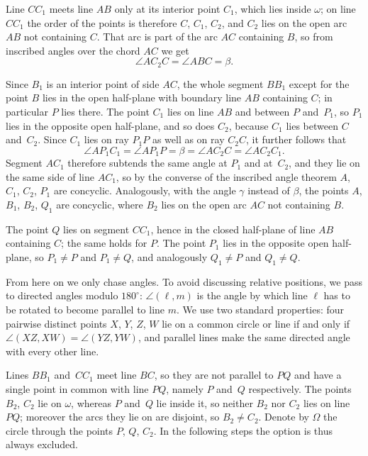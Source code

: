 {    Line $CC_1$ meets line $AB$ only at its interior point $C_1$, which lies inside $\omega$; on line $CC_1$ the order of the points is therefore $C$, $C_1$, $C_2$, and $C_2$ lies on the open arc $AB$ not containing $C$. That arc is part of the arc $AC$ containing $B$, so from inscribed angles over the chord $AC$ we get
    $$
    \angle AC_2C = \angle ABC = \beta.
    $$

    Since $B_1$ is an interior point of side $AC$, the whole segment $BB_1$ except for the point $B$ lies in the open half-plane with boundary line $AB$ containing $C$; in particular $P$ lies there. The point $C_1$ lies on line $AB$ and between $P$ and~$P_1$, so $P_1$ lies in the opposite open half-plane, and so does $C_2$, because $C_1$ lies between $C$ and~$C_2$. Since $C_1$ lies on ray $P_1P$ as well as on ray $C_2C$, it further follows that
    $$
    \angle AP_1C_1 = \angle AP_1P = \beta = \angle AC_2C = \angle AC_2C_1.
    $$
    Segment $AC_1$ therefore subtends the same angle at $P_1$ and at~$C_2$, and they lie on the same side of line $AC_1$, so by the converse of the inscribed angle theorem $A$, $C_1$, $C_2$, $P_1$ are concyclic. Analogously, with the angle $\gamma$ instead of $\beta$, the points $A$, $B_1$, $B_2$, $Q_1$ are concyclic, where $B_2$ lies on the open arc $AC$ not containing $B$.

    The point $Q$ lies on segment $CC_1$, hence in the closed half-plane of line $AB$ containing $C$; the same holds for $P$. The point $P_1$ lies in the opposite open half-plane, so $P_1 \neq P$ and $P_1 \neq Q$, and analogously $Q_1 \neq P$ and $Q_1 \neq Q$.

    From here on we only chase angles. To avoid discussing relative positions, we pass to directed angles modulo $180^\circ$: $\angle(\ell,m)$ is the angle by which line $\ell$ has to be rotated to become parallel to line $m$. We use two standard properties: four pairwise distinct points $X$, $Y$, $Z$, $W$ lie on a common circle or line if and only if $\angle(XZ,XW) = \angle(YZ,YW)$, and parallel lines make the same directed angle with every other line.

    Lines $BB_1$ and~$CC_1$ meet line $BC$, so they are not parallel to $PQ$ and have a single point in common with line $PQ$, namely $P$ and~$Q$ respectively. The points $B_2$, $C_2$ lie on $\omega$, whereas $P$ and~$Q$ lie inside it, so neither $B_2$ nor $C_2$ lies on line $PQ$; moreover the arcs they lie on are disjoint, so $B_2 \neq C_2$. Denote by $\Omega$ the circle through the points $P$, $Q$, $C_2$. In the following steps the option  is thus always excluded.

}
